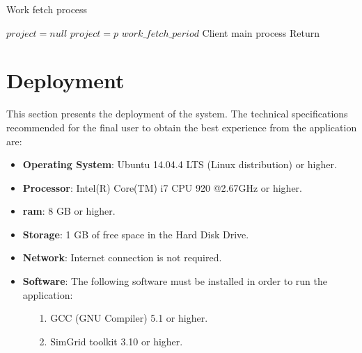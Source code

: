 \clearpage

\begin{algorithm}[h]
	\caption{Work fetch process}
	\label{alg:work_fetch_thread}
  	\scriptsize
	\begin{algorithmic}[1]
		\State $project = null$
		\State $project = p$
		\EndIf
		\EndFor
		\State {}
		\EndIf		
		\State {} $work\_fetch\_period$
		\EndWhile	
		\State {} Client main process
		\State Return
		\EndFunction
	\end{algorithmic}
\end{algorithm}


\section{Deployment}
\label{sec:deployment}

This section presents the deployment of the system. The technical specifications recommended for the final user to obtain the best experience from the application are:

\begin{itemize}

\item \textbf{Operating System}: Ubuntu 14.04.4 LTS (Linux distribution) or higher.

\item \textbf{Processor}: Intel(R) Core(TM) i7 CPU 920 @2.67GHz or higher.

\item \textbf{\gls{ram}}: 8 GB or higher.

\item \textbf{Storage}: 1 GB of free space in the Hard Disk Drive.

\item \textbf{Network}: Internet connection is not required.

\item \textbf{Software}: The following software must be installed in order to run the application:

	\begin{itemize}

	\item[1.] GCC (GNU Compiler) 5.1 or higher.
	
	\item[2.] SimGrid toolkit 3.10 or higher.
	
	\end{itemize}

\end{itemize}


